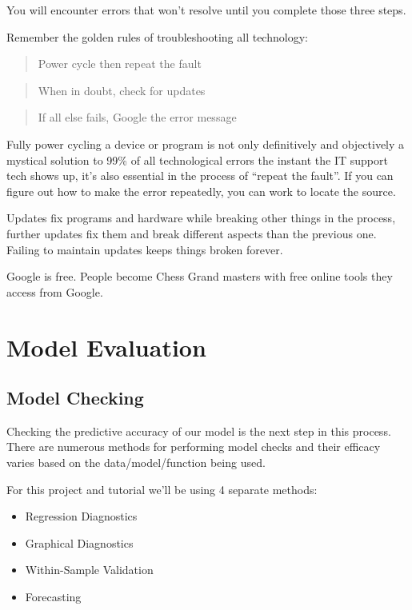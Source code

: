 \documentclass[
  11,
]{book}
\begin{document}
You will encounter errors that won't resolve until you complete those three steps.

Remember the golden rules of troubleshooting all technology:

\begin{quote}
Power cycle then repeat the fault
\end{quote}

\begin{quote}
When in doubt, check for updates
\end{quote}

\begin{quote}
If all else fails, Google the error message
\end{quote}

Fully power cycling a device or program is not only definitively and objectively a mystical solution to 99\% of all technological errors the instant the IT support tech shows up, it's also essential in the process of ``repeat the fault''. If you can figure out how to make the error repeatedly, you can work to locate the source.

Updates fix programs and hardware while breaking other things in the process, further updates fix them and break different aspects than the previous one. Failing to maintain updates keeps things broken forever.

Google is free. People become Chess Grand masters with free online tools they access from Google.

\hypertarget{part-model-evaluation}{%
\part{Model Evaluation}\label{part-model-evaluation}}

\hypertarget{model-checking}{%
\chapter*{Model Checking}\label{model-checking}}


Checking the predictive accuracy of our model is the next step in this process. There are numerous methods for performing model checks and their efficacy varies based on the data/model/function being used.

For this project and tutorial we'll be using 4 separate methods:

\begin{itemize}
\item
  Regression Diagnostics
\item
  Graphical Diagnostics
\item
  Within-Sample Validation
\item
  Forecasting
\end{itemize}
\end{document}
